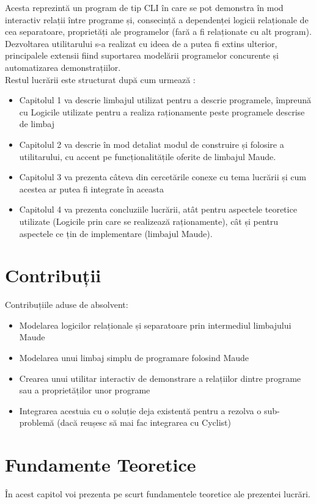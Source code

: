 \documentclass[12pt,a4paper]{article}
\begin{document}
Acesta reprezintă un program de tip CLI în care se pot demonstra în mod interactiv relații între programe și, consecință a dependenței logicii relaționale de cea separatoare, proprietăți ale programelor (fară a fi relaționate cu alt program). Dezvoltarea utilitarului s-a realizat cu ideea de a putea fi extins ulterior, principalele extensii fiind suportarea modelării programelor concurente și automatizarea demonstrațiilor. \\

Restul lucrării este structurat după cum urmează : 
\begin{itemize}
	\item Capitolul 1 va descrie limbajul utilizat pentru a descrie programele, împreună cu Logicile utilizate pentru a realiza raționamente peste programele descrise de limbaj
	\item Capitolul 2 va descrie în mod detaliat modul de construire și folosire a utilitarului, cu accent pe funcționalitățile oferite de limbajul Maude.
	\item Capitolul 3 va prezenta câteva din cercetările conexe cu tema lucrării și cum acestea ar putea fi integrate în aceasta
	\item Capitolul 4 va prezenta concluziile lucrării, atât pentru aspectele teoretice utilizate (Logicile prin care se realizează raționamente), cât și pentru aspectele ce țin de implementare (limbajul Maude).
\end{itemize}


\section{Contribuții}
Contribuțiile aduse de absolvent:
\begin{itemize}
	\item Modelarea logicilor relaționale și separatoare prin intermediul limbajului Maude
	\item Modelarea unui limbaj simplu de programare folosind Maude
	\item Crearea unui utilitar interactiv de demonstrare a relațiilor dintre programe sau a proprietăților unor programe
	\item Integrarea acestuia cu o soluție deja existentă pentru a rezolva o sub-problemă (dacă reușesc să mai fac integrarea cu Cyclist)
\end{itemize}
\section{Fundamente Teoretice}
În acest capitol voi prezenta pe scurt fundamentele teoretice ale prezentei lucrări.
\end{document}
